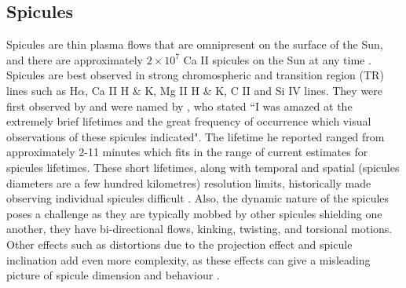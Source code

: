 \documentclass[12pt]{ociamthesis}
\newcommand{\np}{\\ \\}
\begin{document}
\subsection{Spicules}
\label{subsec:Spicules}
Spicules are thin plasma flows that are omnipresent on the surface of the Sun, and there are approximately $2 \times 10^{7}$ Ca II spicules on the Sun at any time \citep{Judge_2010ApJ}. Spicules are best observed in strong chromospheric and transition region (TR) lines such as H$\alpha$, Ca II H \& K, Mg II H \& K, C II and Si IV lines. They were first observed by \cite{Secchi1877} and were named by \cite{Roberts1945ApJ}, who stated ``I was amazed at the extremely brief lifetimes and the great frequency of occurrence which visual observations of these spicules indicated". The lifetime he reported ranged from approximately 2-11 minutes which fits in the range of current estimates for spicules lifetimes. These short lifetimes, along with temporal and spatial (spicules diameters are a few hundred kilometres) resolution limits, historically made observing individual spicules difficult \citep{Sterling_2000SoPh}. Also, the dynamic nature of the spicules poses a challenge as they are typically mobbed by other spicules shielding one another, they have bi-directional flows, kinking, twisting, and torsional motions. Other effects such as distortions due to the projection effect and spicule inclination add even more complexity, as these effects can give a misleading picture of spicule dimension and behaviour \citep{Porfir2016A}. \np
%
\end{document}
